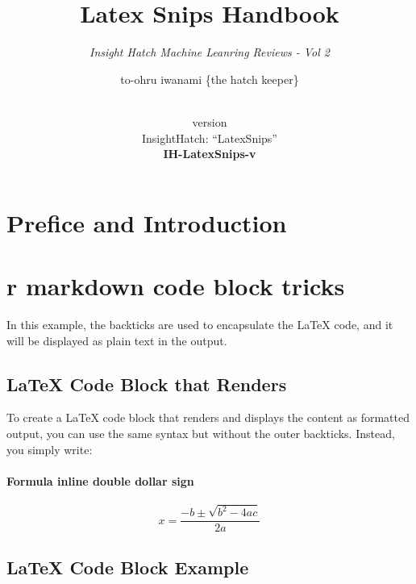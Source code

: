\documentclass[
  12 pt,
  a4paper,
]{book}
\title{Latex Snips Handbook}
\subtitle{\textit{Insight Hatch Machine Leanring Reviews - Vol 2}}
\author{to-ohru iwanami \{the hatch keeper\}}
\date{\vhCurrentDate\\
version \vhCurrentVersion\\
InsightHatch: ``LatexSnips''\\
\textbf{IH-LatexSnips-v}\textbf{\vhCurrentVersion}}
\numberwithin{equation}{section}
\theoremstyle{plain}      %
\theoremstyle{definition} %
\theoremstyle{remark}     %
\theoremstyle{note}         %
\begin{document}
\frontmatter
\maketitle

{
\setcounter{tocdepth}{1}
\tableofcontents
}
\mainmatter
\begin{versionhistory}
\end{versionhistory}
\newpage

\setcounter{table}{0}

\frontmatter

\hypertarget{prefice-and-introduction}{%
\chapter{Prefice and Introduction}\label{prefice-and-introduction}}

\newpage

\hypertarget{r-markdown-code-block-tricks}{%
\chapter{r markdown code block
tricks}\label{r-markdown-code-block-tricks}}

In this example, the backticks are used to encapsulate the LaTeX code,
and it will be displayed as plain text in the output.

\hypertarget{latex-code-block-that-renders}{%
\section{LaTeX Code Block that
Renders}\label{latex-code-block-that-renders}}

To create a LaTeX code block that renders and displays the content as
formatted output, you can use the same syntax but without the outer
backticks. Instead, you simply write:

\hypertarget{formula-inline-double-dollar-sign}{%
\subsubsection{Formula inline double dollar
sign}\label{formula-inline-double-dollar-sign}}

\[
x = \frac{-b \pm \sqrt{b^2 - 4ac}}{2a}
\]

\hypertarget{latex-code-block-example}{%
\section{LaTeX Code Block Example}\label{latex-code-block-example}}
\end{document}
